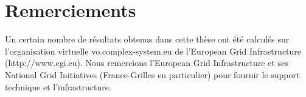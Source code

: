 




\begingroup

\let\clearpage\relax
\let\cleardoublepage\relax
\let\cleardoublepage\relax

\chapter*{Remerciements}










Un certain nombre de résultats obtenus dans cette thèse ont été calculés sur l'organisation virtuelle vo.complex-system.eu de l'European Grid Infrastructure (http://www.egi.eu). Nous remercions l'European Grid Infrastructure et ses National Grid Initiatives (France-Grilles en particulier) pour fournir le support technique et l'infrastructure. \\




\endgroup